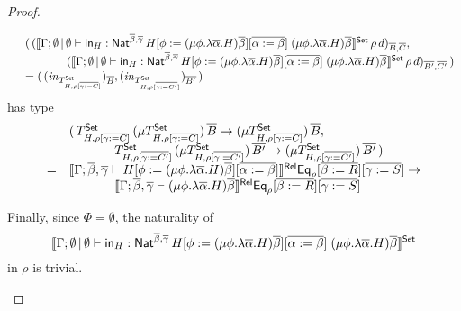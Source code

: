 \documentclass[runningheads]{llncs}
\newcommand{\set}{\mathsf{Set}}
\begin{document}
\begin{proof}
\begin{itemize}
\[\begin{array}{ll}
 & (\,(\setsem{\Gamma;\emptyset \,|\, \emptyset \vdash \tin_H :
      \Nat^{\ol{\beta},\ol{\gamma}} \, H[\phi := (\mu \phi.\lambda
        {\overline \alpha}.H){\overline \beta}][\ol{\alpha := \beta}]
      \;(\mu \phi.\lambda {\overline \alpha}.H){\overline
        \beta}}\,\rho\,d)_{\ol{B},\ol{C}},\,\\ & \hspace*{0.5in}(\setsem{\Gamma;\emptyset
      \,|\, \emptyset \vdash \tin_H : \Nat^{\ol{\beta},\ol{\gamma}} \,
      H[\phi := (\mu \phi.\lambda {\overline \alpha}.H){\overline
          \beta}][\ol{\alpha := \beta}] \;(\mu \phi.\lambda {\overline
        \alpha}.H){\overline
        \beta}}\,\rho\,d)_{\ol{B'},\ol{C'}}\,)\\ &= (\,
    (\mathit{in}_{T^\set_{H,\rho[\ol{\gamma := C}]}})_{\ol{B}},
    (\mathit{in}_{T^\set_{H,\rho[\ol{\gamma := C'}]}})_{\ol{B'}}\,)
\end{array}\]
has type
\[\begin{array}{ll}
& (\, T^\set_{H,\rho[\ol{\gamma := C}]}\, (\mu
T^\set_{H,\rho[\ol{\gamma := C}]}) \, 
\ol{B} \to (\mu T^\set_{H,\rho[\ol{\gamma := C}]}) \, \ol{B}, \, \\
& \hspace*{0.5in}T^\set_{H,\rho[\ol{\gamma := C'}]}\, (\mu
T^\set_{H,\rho[\ol{\gamma := C'}]}) \, 
\ol{B'} \to (\mu T^\set_{H,\rho[\ol{\gamma := C'}]}) \,\ol{B'} \, )\\
= &
 \relsem{\Gamma;\ol{\beta},\ol{\gamma} \vdash H[\phi := (\mu
    \phi.\lambda {\overline \alpha}.H){\overline \beta}][\ol{\alpha :=
      \beta}]}\Eq_\rho[\ol{\beta := R}][\ol{\gamma := S}] \to\\
 & \hspace*{0.5in} \relsem{\Gamma;\ol{\beta},\ol{\gamma} \vdash (\mu
  \phi.\lambda \ol{\alpha}.H)\ol{\beta}} \Eq_\rho[\ol{\beta:=
    R}][\ol{\gamma :=S}]
\end{array}\]

Finally, since $\Phi = \emptyset$, the naturality of
\[
\setsem{\Gamma;\emptyset \,|\, \emptyset \vdash \tin_H :
  \Nat^{\ol{\beta},\ol{\gamma}} \, H[\phi := (\mu \phi.\lambda
    {\overline \alpha}.H){\overline \beta}][\ol{\alpha := \beta}]
  \;(\mu \phi.\lambda {\overline \alpha}.H){\overline \beta}}
\]
in $\rho$ is trivial.




\end{itemize}
\end{proof}
\end{document}
